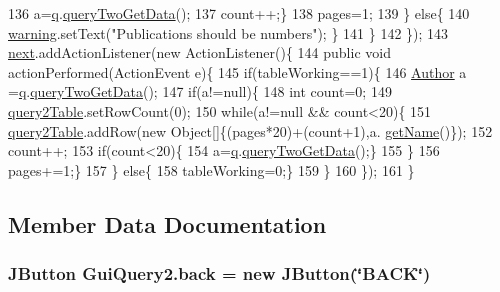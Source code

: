 \begin{DoxyCode}
136                             a=\hyperlink{classGUIQuery_a2a20445d749185552014142b78f3e071}{q}.\hyperlink{classQueryFacade_a01ab933fe12fac06556af3e2948dbe58}{queryTwoGetData}();
137                             count++;\}
138                         pages=1;
139                     \} \textcolor{keywordflow}{else}\{
140                         \hyperlink{classGuiQuery2_ab813118a2db6297717b32f054e5305e9}{warning}.setText(\textcolor{stringliteral}{"Publications should be numbers"}); \}
141                 \}
142             \}); 
143         \hyperlink{classGuiQuery2_a2a63533eaacb408e66da8beb1738b140}{next}.addActionListener(\textcolor{keyword}{new} ActionListener()\{
144             \textcolor{keyword}{public} \textcolor{keywordtype}{void} actionPerformed(ActionEvent e)\{
145                 \textcolor{keywordflow}{if}(tableWorking==1)\{
146                     \hyperlink{classAuthor}{Author} a =\hyperlink{classGUIQuery_a2a20445d749185552014142b78f3e071}{q}.\hyperlink{classQueryFacade_a01ab933fe12fac06556af3e2948dbe58}{queryTwoGetData}();
147                     \textcolor{keywordflow}{if}(a!=null)\{    
148                         \textcolor{keywordtype}{int} count=0;
149                         \hyperlink{classGuiQuery2_a0b3f16b0f92eabbdea82f4abd3ba4377}{query2Table}.setRowCount(0);
150                         \textcolor{keywordflow}{while}(a!=null && count<20)\{
151                             \hyperlink{classGuiQuery2_a0b3f16b0f92eabbdea82f4abd3ba4377}{query2Table}.addRow(\textcolor{keyword}{new} Object[]\{(pages*20)+(count+1),a.
      \hyperlink{classAuthor_a1b7371df3d6db53518e2f3556241c52e}{getName}()\});
152                             count++;
153                             \textcolor{keywordflow}{if}(count<20)\{
154                             a=\hyperlink{classGUIQuery_a2a20445d749185552014142b78f3e071}{q}.\hyperlink{classQueryFacade_a01ab933fe12fac06556af3e2948dbe58}{queryTwoGetData}();\} 
155                         \}
156                         pages+=1;\}
157                 \} \textcolor{keywordflow}{else}\{
158                     tableWorking=0;\}
159             \}
160         \});
161     \}
\end{DoxyCode}


\subsection{Member Data Documentation}
\subsubsection[{\texorpdfstring{back}{back}}]{\setlength{\rightskip}{0pt plus 5cm}J\+Button Gui\+Query2.\+back = new J\+Button(\char`\"{}B\+A\+CK\char`\"{})\hspace{0.3cm}{\ttfamily [private]}}\hypertarget{classGuiQuery2_adb82d5a5b40c916e957bddbca80efb4b}{}\label{classGuiQuery2_adb82d5a5b40c916e957bddbca80efb4b}
